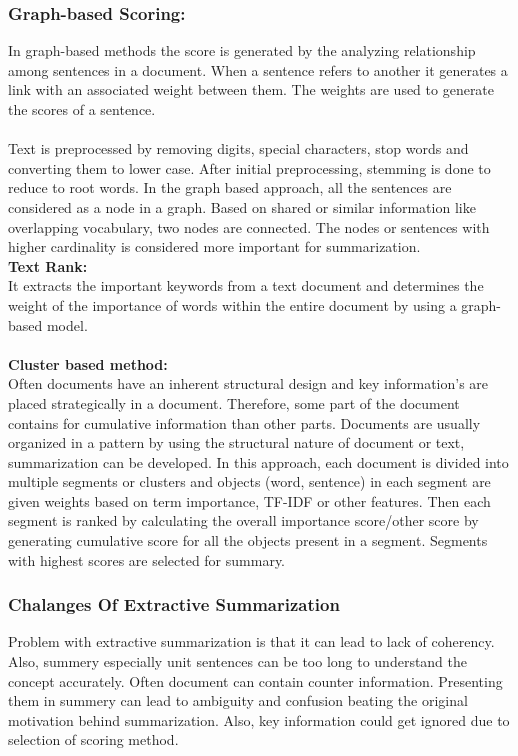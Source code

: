 \documentclass[conference]{IEEEtran}
\begin{document}
\subsubsection{Graph-based Scoring:}
In graph-based methods the score is generated by the analyzing relationship among sentences in a document. When a sentence refers to another it generates a link with an associated weight between them. The weights are used to generate the scores of a sentence.\\\\
Text is preprocessed by removing digits, special characters, stop words and converting them to lower case. After initial preprocessing, stemming is done to reduce to root words. In the graph based approach, all the sentences are considered as a node in a graph. Based on shared or similar information like overlapping vocabulary, two nodes are connected. The nodes or sentences with higher cardinality is considered more important for summarization.\\

\textbf{Text Rank:}\\
It extracts the important keywords from a text document and determines the weight of the importance of words within the entire document by using a graph-based model.\\\\
\textbf{Cluster based method:}\\
Often documents have an inherent structural design and key information's are placed strategically in a document. Therefore, some part of the document contains for cumulative information than other parts. Documents are usually organized in a pattern by using the structural nature of document or text, summarization can be developed. In this approach, each document is divided into multiple segments or clusters and objects (word, sentence) in each segment are given weights based on term importance, TF-IDF or other features. Then each segment is ranked by calculating the overall importance score/other score by generating cumulative score for all the objects present in a segment. Segments with highest scores are selected for summary.
\subsubsection{Chalanges Of Extractive Summarization}
Problem with extractive summarization is that it can lead to lack of coherency. Also, summery especially unit sentences can be too long to understand the concept accurately. Often document can contain counter information. Presenting them in summery can lead to ambiguity and confusion beating the original motivation behind summarization.  Also, key information could get ignored due to selection of scoring method. \\
\end{document}
